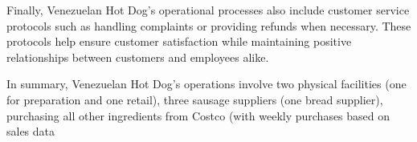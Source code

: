  Finally, Venezuelan Hot Dog's operational processes also include customer service protocols such as handling complaints or providing refunds when necessary. These protocols help ensure customer satisfaction while maintaining positive relationships between customers and employees alike. 

 In summary, Venezuelan Hot Dog's operations involve two physical facilities (one for preparation and one retail), three sausage suppliers (one bread supplier), purchasing all other ingredients from Costco (with weekly purchases based on sales data